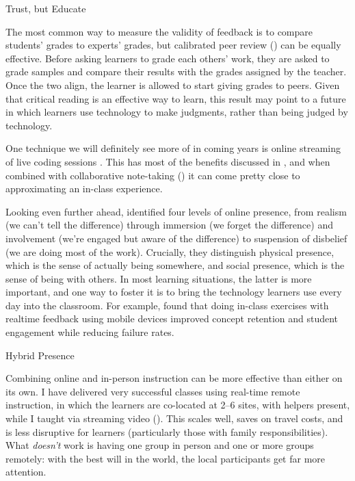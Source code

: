 \begin{callout}{Trust, but Educate}

  The most common way to measure the validity of feedback is to
  compare students' grades to experts' grades, but calibrated peer
  review () can be equally effective.
  Before asking learners to grade each others' work, they are asked to
  grade samples and compare their results with the grades assigned by
  the teacher.  Once the two align, the learner is allowed to start
  giving grades to peers.  Given that critical reading is an effective
  way to learn, this result may point to a future in which learners
  use technology to make judgments, rather than being judged by
  technology.

\end{callout}

One technique we will definitely see more of in coming years is online
streaming of live coding sessions \cite{Haar2017}. This has most of
the benefits discussed in , and when
combined with collaborative note-taking
() it can come pretty close to
approximating an in-class experience.

Looking even further ahead, \cite{Ijss2000} identified four levels of
online presence, from realism (we can't tell the difference) through
immersion (we forget the difference) and involvement (we're engaged
but aware of the difference) to suspension of disbelief (we are doing
most of the work).  Crucially, they distinguish physical presence,
which is the sense of actually being somewhere, and social presence,
which is the sense of being with others. In most learning situations,
the latter is more important, and one way to foster it is to bring the
technology learners use every day into the classroom.  For example,
\cite{Deb2018} found that doing in-class exercises with realtime
feedback using mobile devices improved concept retention and student
engagement while reducing failure rates.

\begin{callout}{Hybrid Presence}

  Combining online and in-person instruction can be more effective
  than either on its own.  I have delivered very successful classes
  using real-time remote instruction, in which the learners are
  co-located at 2--6 sites, with helpers present, while I taught via
  streaming video ().  This scales well, saves
  on travel costs, and is less disruptive for learners (particularly
  those with family responsibilities).  What \emph{doesn't} work is
  having one group in person and one or more groups remotely: with the
  best will in the world, the local participants get far more
  attention.

\end{callout}


